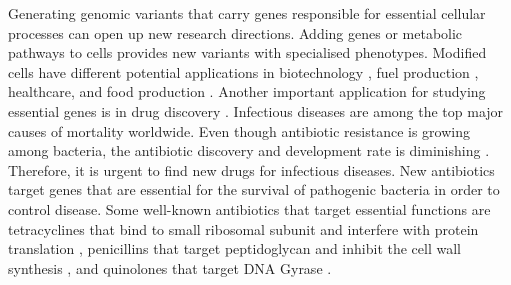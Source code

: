 \documentclass[12pt,letterpaper]{article}
\begin{document}
Generating genomic variants that carry genes responsible for essential cellular processes can open up new research directions. Adding genes or metabolic pathways to cells provides new variants with specialised phenotypes. Modified cells have different potential applications in biotechnology \cite{juhas_bacillus_2014}, fuel production \cite{seo_synthetic_2013}, healthcare, and food production \cite{juhas_meeting_2013}. Another important application for studying essential genes is in drug discovery \cite{juhas_essential_2012}. Infectious diseases are among the top major causes of mortality worldwide. Even though antibiotic resistance is growing among bacteria, the antibiotic discovery and development rate is diminishing \cite{fischbach_antibiotics_2009, nathan_antibiotics_2004}. Therefore, it is urgent to find new drugs for infectious diseases. New antibiotics target genes that are essential for the survival of pathogenic bacteria in order to control disease. Some well-known antibiotics that target essential functions are tetracyclines that bind to small ribosomal subunit and interfere with protein translation \cite{brodersen_structural_2000}, penicillins that target peptidoglycan and inhibit the cell wall synthesis \cite{chung_rapid_2009}, and quinolones that target DNA Gyrase \cite{marcusson_interplay_2009}.
\end{document}

